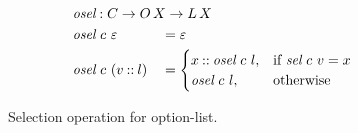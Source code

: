 \begin{figure}[H]
  \onehalfspacing
  \begin{alignat*}{2}
    &\mathrlap{\osel : \cS \to \OLst \to \Lst} \\
    &\osel\ \cE\ \nil &&= \nil \\
    &\osel\ \cE\ (\var \cons \lst) &&=
    \begin{cases}
      \val \cons \osel\ \cE\ \lst, & \text{if }\sel\ \cE\ \var = \val \\
      \osel\ \cE\ \lst, & \text{otherwise}%
    \end{cases}
  \end{alignat*}
  \caption{Selection operation for option-list.}
  \label{fig:osel}
\end{figure}


